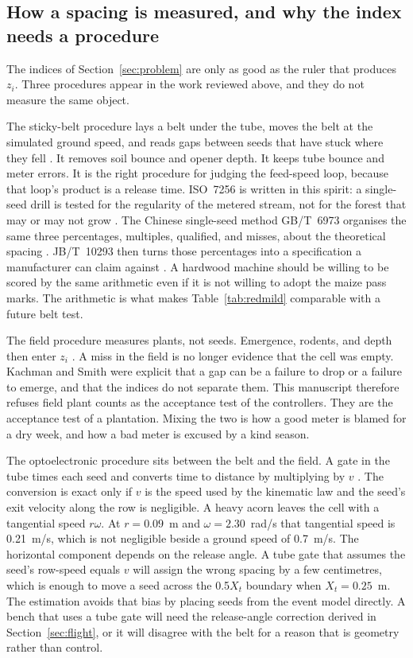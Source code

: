 \subsection{How a spacing is measured, and why the index needs a procedure}

The indices of Section~\ref{sec:problem} are only as good as the ruler that produces $z_i$. Three procedures appear in the work reviewed above, and they do not measure the same object.

The sticky-belt procedure lays a belt under the tube, moves the belt at the simulated ground speed, and reads gaps between seeds that have stuck where they fell \cite{panning2000,onal2012,onal2009}. It removes soil bounce and opener depth. It keeps tube bounce and meter errors. It is the right procedure for judging the feed-speed loop, because that loop's product is a release time. ISO~7256 is written in this spirit: a single-seed drill is tested for the regularity of the metered stream, not for the forest that may or may not grow \cite{iso7256}. The Chinese single-seed method GB/T~6973 organises the same three percentages, multiples, qualified, and misses, about the theoretical spacing \cite{gb6973}. JB/T~10293 then turns those percentages into a specification a manufacturer can claim against \cite{jb10293}. A hardwood machine should be willing to be scored by the same arithmetic even if it is not willing to adopt the maize pass marks. The arithmetic is what makes Table~\ref{tab:redmild} comparable with a future belt test.

The field procedure measures plants, not seeds. Emergence, rodents, and depth then enter $z_i$ \cite{lof2019,kachman1995}. A miss in the field is no longer evidence that the cell was empty. Kachman and Smith were explicit that a gap can be a failure to drop or a failure to emerge, and that the indices do not separate them. This manuscript therefore refuses field plant counts as the acceptance test of the controllers. They are the acceptance test of a plantation. Mixing the two is how a good meter is blamed for a dry week, and how a bad meter is excused by a kind season.

The optoelectronic procedure sits between the belt and the field. A gate in the tube times each seed and converts time to distance by multiplying by $v$ \cite{kocher1998,lan1999}. The conversion is exact only if $v$ is the speed used by the kinematic law and the seed's exit velocity along the row is negligible. A heavy acorn leaves the cell with a tangential speed $r\omega$. At $r=0.09$~m and $\omega=2.30$~rad/s that tangential speed is 0.21~m/s, which is not negligible beside a ground speed of 0.7~m/s. The horizontal component depends on the release angle. A tube gate that assumes the seed's row-speed equals $v$ will assign the wrong spacing by a few centimetres, which is enough to move a seed across the 0.5$X_t$ boundary when $X_t=0.25$~m. The estimation avoids that bias by placing seeds from the event model directly. A bench that uses a tube gate will need the release-angle correction derived in Section~\ref{sec:flight}, or it will disagree with the belt for a reason that is geometry rather than control.

